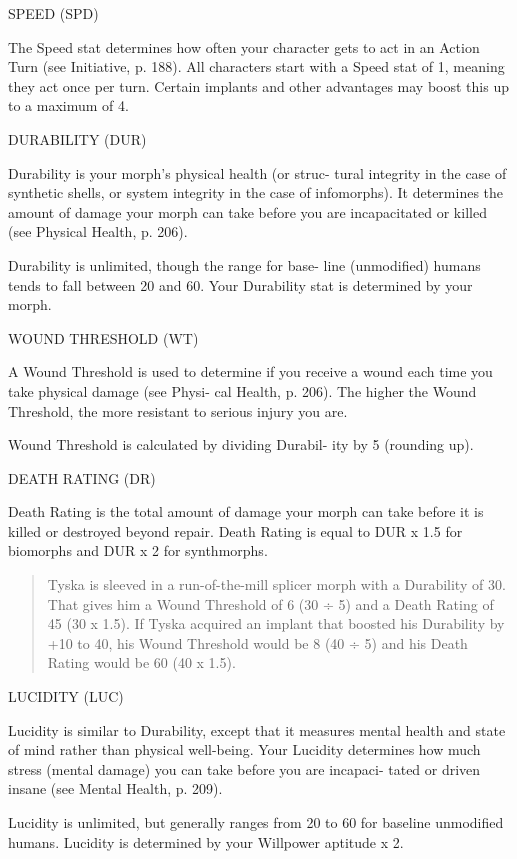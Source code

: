 SPEED (SPD)

The Speed stat determines how often your character
gets to act in an Action Turn (see Initiative, p. 188).
All characters start with a Speed stat of 1, meaning
they act once per turn. Certain implants and other
advantages may boost this up to a maximum of 4.

DURABILITY (DUR)

Durability is your morph's physical health (or struc-
tural integrity in the case of synthetic shells, or system
integrity in the case of infomorphs). It determines the
amount of damage your morph can take before you are
incapacitated or killed (see Physical Health, p. 206).

Durability is unlimited, though the range for base-
line (unmodified) humans tends to fall between 20 and
60. Your Durability stat is determined by your morph.

WOUND THRESHOLD (WT)

A Wound Threshold is used to determine if you receive a
wound each time you take physical damage (see Physi-
cal Health, p. 206). The higher the Wound Threshold,
the more resistant to serious injury you are.

Wound Threshold is calculated by dividing Durabil-
ity by 5 (rounding up).

DEATH RATING (DR)

Death Rating is the total amount of damage your
morph can take before it is killed or destroyed
beyond repair. Death Rating is equal to DUR x 1.5 for
biomorphs and DUR x 2 for synthmorphs.


\begin{quotation}
  Tyska is sleeved in a run-of-the-mill splicer morph with a
  Durability of 30. That gives him a Wound Threshold of 6 (30 ÷ 5) and
  a Death Rating of 45 (30 x 1.5). If Tyska acquired an implant that
  boosted his Durability by +10 to 40, his Wound Threshold would be 8
  (40 ÷ 5) and his Death Rating would be 60 (40 x 1.5).
\end{quotation}

LUCIDITY (LUC)

Lucidity is similar to Durability, except that it measures
mental health and state of mind rather than physical
well-being. Your Lucidity determines how much stress
(mental damage) you can take before you are incapaci-
tated or driven insane (see Mental Health, p. 209).

Lucidity is unlimited, but generally ranges from
20 to 60 for baseline unmodified humans. Lucidity is
determined by your Willpower aptitude x 2.

